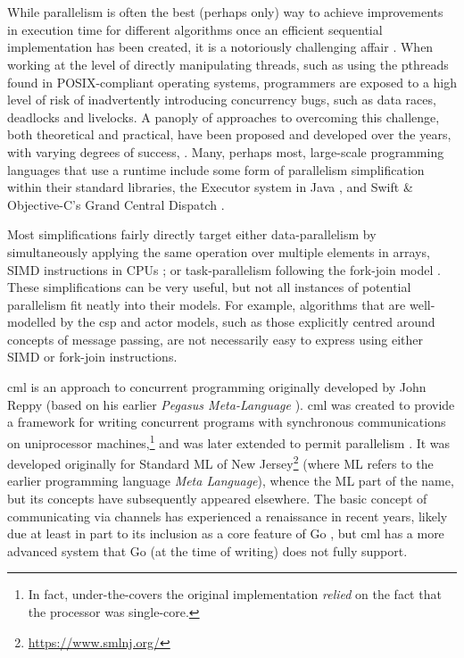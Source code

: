 \section{\label{sec:back:cml}}

While parallelism is often the best (perhaps only) way to achieve improvements in execution time for different algorithms once an efficient sequential implementation has been created, it is a notoriously challenging affair \cite{Shun2017}.  When working at the level of directly manipulating threads, such as using the pthreads found in POSIX-compliant operating systems, programmers are exposed to a high level of risk of inadvertently introducing concurrency bugs, such as data races, deadlocks and livelocks.  A panoply of approaches to overcoming this challenge, both theoretical and practical, have been proposed and developed over the years, with varying degrees of success, \eg{} \cite{Boyapati2002,Bocq2012,Seinstra2004}.  Many, perhaps most, large-scale programming languages that use a runtime include some form of parallelism simplification within their standard libraries, \eg{} the Executor system in Java \cite[Ch. 4]{Fernandez2012}, and Swift \& Objective-C's Grand Central Dispatch \cite{Maskrey2018}.

Most simplifications fairly directly target either data-parallelism by simultaneously applying the same operation over multiple elements in arrays, \eg{} SIMD instructions in CPUs \cite{Hughes2015}; or task-parallelism following the fork-join model \cite{McCool2012}.  These simplifications can be very useful, but not all instances of potential parallelism fit neatly into their models.  For example, algorithms that are well-modelled by the \gls{csp} and \gls{actor} models, such as those explicitly centred around concepts of message passing, are not necessarily easy to express using either SIMD or fork-join instructions.

\Gls{cml} \cite{Reppy1991,Panangaden1997} is an approach to concurrent programming originally developed by John Reppy (based on his earlier \emph{Pegasus Meta-Language} \cite{Reppy1988}).  \Gls{cml} was created to provide a framework for writing concurrent programs with synchronous communications on uniprocessor machines,\footnote{In fact, under-the-covers the original implementation \emph{relied} on the fact that the processor was single-core.} and was later extended to permit parallelism \cite{Reppy2009a}.  It was developed originally for Standard ML of New Jersey\footnote{\url{https://www.smlnj.org/}} (where ML refers to the earlier programming language \emph{Meta Language}), whence the ML part of the name, but its concepts have subsequently appeared elsewhere.  The basic concept of communicating via channels has experienced a renaissance in recent years, likely due at least in part to its inclusion as a core feature of Go \cite{Meyerson2014}, but \gls{cml} has a more advanced system that Go (at the time of writing) does not fully support.

